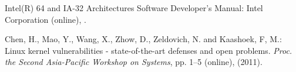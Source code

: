 \documentclass[english,preprint,JIP]{ipsj}
\begin{document}
\begin{thebibliography}{99}
  Intel(R) 64 and IA-32 Architectures Software Developer’s Manual: Intel Corporation (online),  .



    Chen, H., Mao, Y., Wang, X., Zhow, D., Zeldovich, N. and Kaashoek, F, M.: Linux kernel vulnerabilities - state-of-the-art defenses and open problems. \textit{Proc. the Second Asia-Pacific Workshop on Systems}, pp. 1--5 (online),  (2011).



\end{thebibliography}
\end{document}
